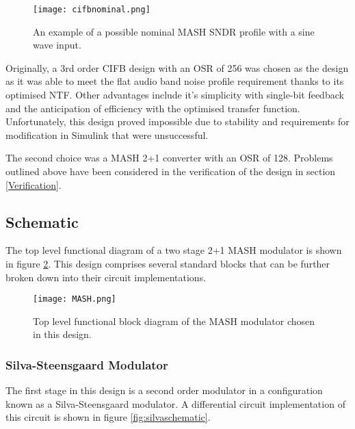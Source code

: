 \begin{figure}
    \begin{center}
    \texttt{[image: cifbnominal.png]}
    \label{fig:cifbnominal}
    \caption{An example of a possible nominal MASH SNDR profile with a sine wave input.}
    \end{center}
\end{figure}


Originally, a 3rd order CIFB design with an OSR of 256 was chosen as the design as it was able to meet the flat audio band noise profile requirement thanks to its optimised NTF.
Other advantages include it's simplicity with single-bit feedback and the anticipation of efficiency with the optimised transfer function.
Unfortunately, this design proved impossible due to stability and requirements for modification in Simulink that were unsuccessful.

The second choice was a MASH 2+1 converter with an OSR of 128.
Problems outlined above have been considered in the verification of the design in section \ref{Verification}.

    \subsection{Schematic}
    \label{Design:schematic}
    The top level functional diagram of a two stage 2+1 MASH modulator is shown in figure \ref{fig:MASH}.
    This design comprises several standard blocks that can be further broken down into their circuit implementations.

    \begin{figure}
        \begin{center}
        \texttt{[image: MASH.png]}
        \label{fig:MASH}
        \caption{Top level functional block diagram of the MASH modulator chosen in this design.}
        \end{center}
    \end{figure}

        \subsubsection{Silva-Steensgaard Modulator}
        The first stage in this design is a second order modulator in a configuration known as a Silva-Steensgaard modulator.
        A differential circuit implementation of this circuit is shown in figure \ref{fig:silvaschematic}.

